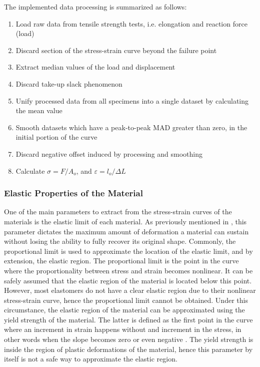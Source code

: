 The implemented data processing is summarized as follows:
 \begin{enumerate}[noitemsep] %
    \item Load raw data from tensile strength tests, i.e. elongation and reaction force (load)
    \item Discard section of the stress-strain curve beyond the failure point
    \item Extract median values of the load and displacement
    \item Discard take-up slack phenomenon
    \item Unify processed data from all specimens into a single dataset by calculating the mean value
    \item Smooth datasets which have a peak-to-peak MAD greater than zero, in the initial portion of the curve
    \item Discard negative offset induced by processing and smoothing
    \item Calculate $\sigma = F/A_o$, and $\varepsilon = l_o/\Delta L$
\end{enumerate}

\subsubsection{Elastic Properties of the Material}

One of the main parameters to extract from the stress-strain curves of the materials is the elastic limit of each material. As previously mentioned in , this parameter dictates the maximum amount of deformation a material can sustain without losing the ability to fully recover its original shape. Commonly, the proportional limit is used to approximate the location of the elastic limit, and by extension, the elastic region. The proportional limit is the point in the curve where the proportionality between stress and strain becomes nonlinear. It can be safely assumed that the elastic region of the material is located below this point. However, most elastomers do not have a clear elastic region due to their nonlinear stress-strain curve, hence the proportional limit cannot be obtained. Under this circumstance, the elastic region of the material can be approximated using the yield strength of the material. The latter is defined as the first point in the curve where an increment in strain happens without and increment in the stress, in other words when the slope becomes zero or even negative \cite{astmd638}. The yield strength is inside the region of plastic deformations of the material, hence this parameter by itself is not a safe way to approximate the elastic region. 

